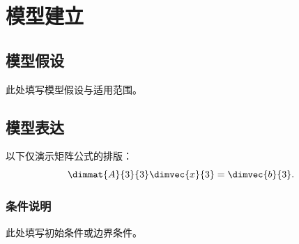 \chapter{模型建立}
\label{chap:model}

\section{模型假设}
此处填写模型假设与适用范围。

\section{模型表达}
以下仅演示矩阵公式的排版：
\begin{equation}
  \dimmat{A}{3}{3}\dimvec{x}{3}=\dimvec{b}{3}.
  \label{eq:linear-model}
\end{equation}

\subsection{条件说明}
此处填写初始条件或边界条件。
